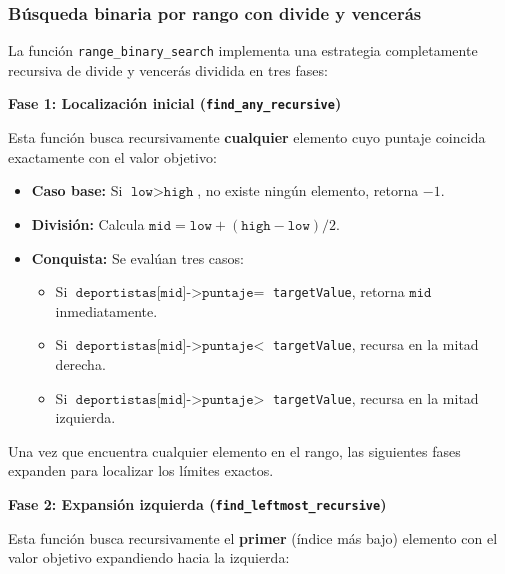 \subsubsection{Búsqueda binaria por rango con divide y vencerás}

La función \texttt{range\_binary\_search} implementa una estrategia completamente recursiva de divide y vencerás dividida en tres fases:

\textbf{Fase 1: Localización inicial (\texttt{find\_any\_recursive})}

Esta función busca recursivamente \textbf{cualquier} elemento cuyo puntaje coincida exactamente con el valor objetivo:

\begin{itemize}
    \item \textbf{Caso base:} Si \(\texttt{low} > \texttt{high}\), no existe ningún elemento, retorna $-1$.
    
    \item \textbf{División:} Calcula \(\texttt{mid} = \texttt{low} + (\texttt{high} - \texttt{low}) / 2\).
    
    \item \textbf{Conquista:} Se evalúan tres casos:
    \begin{itemize}
        \item Si \(\texttt{deportistas[mid]->puntaje} =\) \texttt{targetValue}, retorna \(\texttt{mid}\) inmediatamente.
        \item Si \(\texttt{deportistas[mid]->puntaje} <\) \texttt{targetValue}, recursa en la mitad derecha.
        \item Si \(\texttt{deportistas[mid]->puntaje} >\) \texttt{targetValue}, recursa en la mitad izquierda.
    \end{itemize}
\end{itemize}

Una vez que encuentra cualquier elemento en el rango, las siguientes fases expanden para localizar los límites exactos.

\textbf{Fase 2: Expansión izquierda (\texttt{find\_leftmost\_recursive})}

Esta función busca recursivamente el \textbf{primer} (índice más bajo) elemento con el valor objetivo expandiendo hacia la izquierda:

